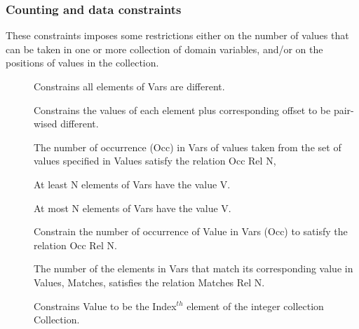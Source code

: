 \subsubsection{Counting and data constraints}

These constraints imposes some restrictions either on the number of
 values that can be taken in one or more collection of domain
 variables, and/or on the positions of values in the collection.
\begin{description}
\item[]
Constrains all elements of Vars are different.

\item[]
Constrains the values of each element plus corresponding offset to be pair-wised different.

\item[]
The number of occurrence (Occ) in Vars of values taken from the set of
values specified in Values satisfy  the relation Occ Rel N,

\item[]
At least N elements of Vars have the value V.

\item[]
At most N elements of Vars have the value V.

\item[]
Constrain the number of occurrence of Value in Vars (Occ) to satisfy
the relation Occ Rel N.

\item[]
The number of the elements in Vars that
 match its corresponding value in Values, Matches, satisfies the
 relation Matches Rel N.

\item[]
Constrains Value to be the Index$^{th}$ element of the integer collection Collection.


\end{description}
